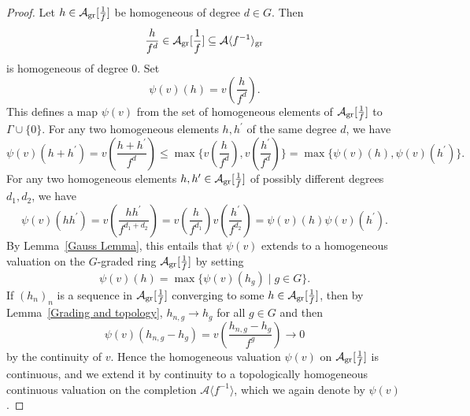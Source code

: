 \documentclass[12pt,twoside,a4paper]{article}
\theoremstyle{definition}
\theoremstyle{remark}
\newcommand\gr{{\rm gr}}
\begin{document}
\begin{proof}
Let $h\in \mathcal{A}_{\gr}[\frac{1}{f}]$ be homogeneous of degree $d\in G$. Then \begin{equation*}\frac{h}{f^{d}}\in \mathcal{A}_{\gr}[\frac{1}{f}]\subseteq \mathcal{A}\langle f^{-1}\rangle_{\gr}\end{equation*}is homogeneous of degree $0$. Set \begin{equation*}\psi(v)(h)=v(\frac{h}{f^{d}}).\end{equation*}This defines a map $\psi(v)$ from the set of homogeneous elements of $\mathcal{A}_{\gr}[\frac{1}{f}]$ to $\Gamma\cup\{0\}$. For any two homogeneous elements $h, h^{\prime}$ of the same degree $d$, we have \begin{equation*}\psi(v)(h+h^{\prime})=v(\frac{h+h^{\prime}}{f^{d}})\leq \max\{v(\frac{h}{f^{d}}), v(\frac{h^{\prime}}{f^{d}})\}=\max\{\psi(v)(h), \psi(v)(h^{\prime})\}.\end{equation*}For any two homogeneous elements $h, h^{\prime}\in \mathcal{A}_{\gr}[\frac{1}{f}]$ of possibly different degrees $d_{1}, d_{2}$, we have \begin{equation*}\psi(v)(hh^{\prime})=v(\frac{hh^{\prime}}{f^{d_{1}+d_{2}}})=v(\frac{h}{f^{d_{1}}})v(\frac{h^{\prime}}{f^{d_{2}}})=\psi(v)(h)\psi(v)(h^{\prime}).\end{equation*}By Lemma~\ref{Gauss Lemma}, this entails that $\psi(v)$ extends to a homogeneous valuation on the $G$-graded ring $\mathcal{A}_{\gr}[\frac{1}{f}]$ by setting \begin{equation*}\psi(v)(h)=\max\{\psi(v)(h_{g})\mid g\in G\}.\end{equation*}If $(h_{n})_{n}$ is a sequence in $\mathcal{A}_{\gr}[\frac{1}{f}]$ converging to some $h\in \mathcal{A}_{\gr}[\frac{1}{f}]$, then by Lemma~\ref{Grading and topology}, $h_{n, g}\to h_{g}$ for all $g\in G$ and then \begin{equation*}\psi(v)(h_{n, g}-h_{g})=v(\frac{h_{n, g}-h_{g}}{f^{g}})\to 0\end{equation*}by the continuity of $v$. Hence the homogeneous valuation $\psi(v)$ on $\mathcal{A}_{\gr}[\frac{1}{f}]$ is continuous, and we extend it by continuity to a topologically homogeneous continuous valuation on the completion $\mathcal{A}\langle f^{-1}\rangle$, which we again denote by $\psi(v)$. 


\end{proof}
\end{document}
